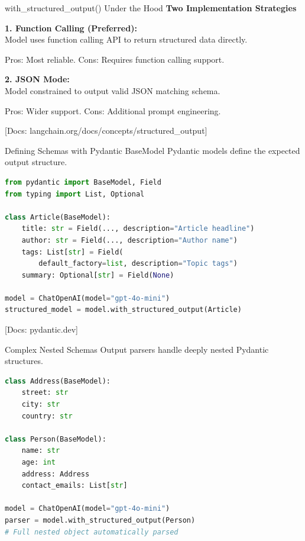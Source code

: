 \documentclass[aspectratio=169,11pt]{beamer}
\newcommand{\docref}[1]{{\scriptsize\color{docgray}[Docs: #1]}}
\begin{document}
\begin{frame}{with\_structured\_output() Under the Hood}
\textbf{Two Implementation Strategies}

\textbf{1. Function Calling (Preferred):}\\
Model uses function calling API to return structured data directly.

Pros: Most reliable. Cons: Requires function calling support.

\vspace{0.08cm}

\textbf{2. JSON Mode:}\\
Model constrained to output valid JSON matching schema.

Pros: Wider support. Cons: Additional prompt engineering.

\docref{langchain.org/docs/concepts/structured\_output}
\end{frame}

\begin{frame}[fragile]{Defining Schemas with Pydantic BaseModel}
Pydantic models define the expected output structure.

\begin{lstlisting}[language=Python]
from pydantic import BaseModel, Field
from typing import List, Optional

class Article(BaseModel):
    title: str = Field(..., description="Article headline")
    author: str = Field(..., description="Author name")
    tags: List[str] = Field(
        default_factory=list, description="Topic tags")
    summary: Optional[str] = Field(None)

model = ChatOpenAI(model="gpt-4o-mini")
structured_model = model.with_structured_output(Article)
\end{lstlisting}

\docref{pydantic.dev}
\end{frame}

\begin{frame}[fragile]{Complex Nested Schemas}
Output parsers handle deeply nested Pydantic structures.

\begin{lstlisting}[language=Python]
class Address(BaseModel):
    street: str
    city: str
    country: str

class Person(BaseModel):
    name: str
    age: int
    address: Address
    contact_emails: List[str]

model = ChatOpenAI(model="gpt-4o-mini")
parser = model.with_structured_output(Person)
# Full nested object automatically parsed
\end{lstlisting}
\end{frame}
\end{document}
